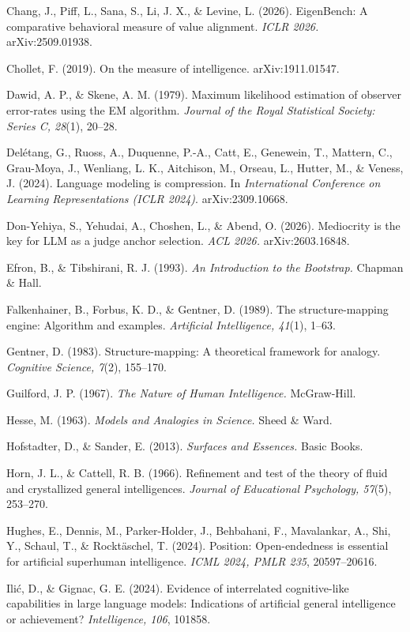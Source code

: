 \documentclass{article}
\begin{document}
Chang, J., Piff, L., Sana, S., Li, J. X., \& Levine, L. (2026). EigenBench: A comparative behavioral measure of value alignment. \emph{ICLR 2026.} arXiv:2509.01938.

Chollet, F. (2019). On the measure of intelligence. arXiv:1911.01547.

Dawid, A. P., \& Skene, A. M. (1979). Maximum likelihood estimation of observer error-rates using the EM algorithm. \emph{Journal of the Royal Statistical Society: Series C, 28}(1), 20--28.

Del\'{e}tang, G., Ruoss, A., Duquenne, P.-A., Catt, E., Genewein, T., Mattern, C., Grau-Moya, J., Wenliang, L. K., Aitchison, M., Orseau, L., Hutter, M., \& Veness, J. (2024). Language modeling is compression. In \emph{International Conference on Learning Representations (ICLR 2024)}. arXiv:2309.10668.

Don-Yehiya, S., Yehudai, A., Choshen, L., \& Abend, O. (2026). Mediocrity is the key for LLM as a judge anchor selection. \emph{ACL 2026.} arXiv:2603.16848.

Efron, B., \& Tibshirani, R. J. (1993). \emph{An Introduction to the Bootstrap.} Chapman \& Hall.

Falkenhainer, B., Forbus, K. D., \& Gentner, D. (1989). The structure-mapping engine: Algorithm and examples. \emph{Artificial Intelligence, 41}(1), 1--63.

Gentner, D. (1983). Structure-mapping: A theoretical framework for analogy. \emph{Cognitive Science, 7}(2), 155--170.

Guilford, J. P. (1967). \emph{The Nature of Human Intelligence.} McGraw-Hill.

Hesse, M. (1963). \emph{Models and Analogies in Science.} Sheed \& Ward.

Hofstadter, D., \& Sander, E. (2013). \emph{Surfaces and Essences.} Basic Books.

Horn, J. L., \& Cattell, R. B. (1966). Refinement and test of the theory of fluid and crystallized general intelligences. \emph{Journal of Educational Psychology, 57}(5), 253--270.

Hughes, E., Dennis, M., Parker-Holder, J., Behbahani, F., Mavalankar, A., Shi, Y., Schaul, T., \& Rockt\"{a}schel, T. (2024). Position: Open-endedness is essential for artificial superhuman intelligence. \emph{ICML 2024, PMLR 235}, 20597--20616.

Ili\'{c}, D., \& Gignac, G. E. (2024). Evidence of interrelated cognitive-like capabilities in large language models: Indications of artificial general intelligence or achievement? \emph{Intelligence, 106}, 101858.
\end{document}
